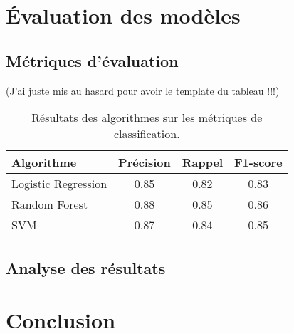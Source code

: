 \documentclass[11pt]{article}
\begin{document}
\section{Évaluation des modèles}

\subsection{Métriques d'évaluation}
(J'ai  juste mis au hasard pour avoir le template du tableau !!!)
\begin{table}[ht]
    \centering
    \begin{tabular}{lccc}
        \toprule
        \textbf{Algorithme} & \textbf{Précision} & \textbf{Rappel} & \textbf{F1-score} \\ \midrule
        Logistic Regression & 0.85               & 0.82            & 0.83              \\
        Random Forest       & 0.88               & 0.85            & 0.86              \\
        SVM                 & 0.87               & 0.84            & 0.85              \\ \bottomrule
    \end{tabular}
    \caption{Résultats des algorithmes sur les métriques de classification.}
    \label{tab:resultats_algo}
\end{table}

\subsection{Analyse des résultats}


\section{Conclusion}



\cite{forest2009variation}
\end{document}
